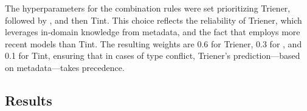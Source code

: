 
The hyperparameters for the combination rules were set prioritizing Trie\ac{ner}, followed by \spacy, and then Tint. This choice reflects the reliability of Trie\ac{ner}, which leverages in-domain knowledge from metadata, and the fact that \spacy employs more recent models than Tint. The resulting weights are 0.6 for Trie\ac{ner}, 0.3 for \spacy, and 0.1 for Tint, ensuring that in cases of type conflict, Trie\ac{ner}'s prediction---based on metadata---takes precedence.




\subsection{Results}\label{sec:results}


